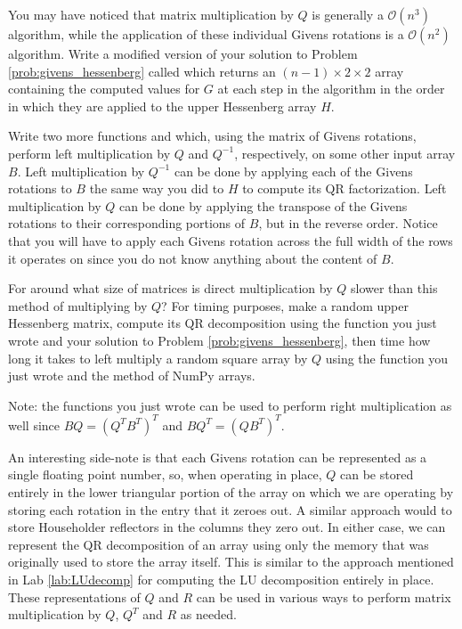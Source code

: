 \begin{problem}
\label{prob:givens_hessenberg_modified}
You may have noticed that matrix multiplication by $Q$ is generally a $\mathcal{O} \left( n^3 \right)$ algorithm, while the application of these individual Givens rotations is a $\mathcal{O} \left( n^2 \right)$ algorithm.
Write a modified version of your solution to Problem \ref{prob:givens_hessenberg} called  which returns 
an $(n-1) \times 2 \times 2$ array containing the computed values for $G$ at each step in the algorithm in the order in which they are applied to the upper Hessenberg array $H$.

Write two more functions  and  which, using the matrix of Givens rotations, perform left multiplication 
by $Q$ and $Q^{-1}$, respectively, on some other input array $B$.
Left multiplication by $Q^{-1}$ can be done by applying each of the Givens rotations to $B$ the same way you did to $H$ to compute its QR factorization.
Left multiplication by $Q$ can be done by applying the transpose of the Givens rotations to their corresponding portions of $B$, but in the reverse order.
Notice that you will have to apply each Givens rotation across the full width of the rows it operates on since you do not know anything about the content of $B$.

For around what size of matrices is direct multiplication by $Q$ slower than this method of multiplying by $Q$?
For timing purposes, make a random upper Hessenberg matrix, compute its QR decomposition using the function you just wrote and your solution to Problem \ref{prob:givens_hessenberg}, then time how long it takes to left multiply a random square array by $Q$ using the function you just wrote and the  method of NumPy arrays.

Note: the functions you just wrote can be used to perform right multiplication as well since $B Q = \left(Q^T B^T \right)^T$ and $B Q^T = \left( Q B^T \right)^T$.
\end{problem}

An interesting side-note is that each Givens rotation can be represented as a single floating point number, so, when operating in place, $Q$ can be stored entirely in the lower triangular portion of the array on which we are operating by storing each rotation in the entry that it zeroes out.
A similar approach would to store Householder reflectors in the columns they zero out.
In either case, we can represent the QR decomposition of an array using only the memory that was originally used to store the array itself.
This is similar to the approach mentioned in Lab \ref{lab:LUdecomp} for computing the LU decomposition entirely in place.
These representations of $Q$ and $R$ can be used in various ways to perform matrix multiplication by $Q$, $Q^T$ and $R$ as needed.

